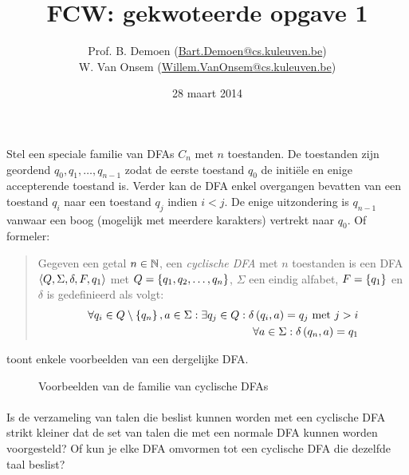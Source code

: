 \documentclass{article}
\title{FCW: gekwoteerde opgave 1}
\author{Prof. B. Demoen (\url{Bart.Demoen@cs.kuleuven.be})\\ W. Van Onsem (\url{Willem.VanOnsem@cs.kuleuven.be})}
\date{28 maart 2014}
\begin{document}
\maketitle
\richtlijnen{}
\aboutanswers{}
\begin{question} Stel een speciale familie van DFAs $C_n$ met $n$ toestanden. De toestanden zijn geordend $q_0,q_1,\ldots,q_{n-1}$ zodat de eerste toestand $q_0$ de initi\"ele en enige accepterende toestand is. Verder kan de DFA enkel overgangen bevatten van een toestand $q_i$ naar een toestand $q_j$ indien $i<j$. De enige uitzondering is $q_{n-1}$ vanwaar een boog (mogelijk met meerdere karakters) vertrekt naar $q_0$. Of formeler:
\begin{quote}\begin{definition}
Gegeven een getal $n\in\mathbb{N}$, een \emph{cyclische DFA} met $n$ toestanden is een DFA $\left\langle Q,\Sigma,\delta,F,q_1 \right\rangle$ met $Q=\left\{ q_1,q_2,\ldots,q_n \right\}$, $\Sigma$ een eindig alfabet, $F=\left\{ q_1 \right\}$ en $\delta$ is gedefinieerd als volgt:
\begin{eqnarray}
\forall q_i\in Q\setminus\left\{ q_n \right\},a\in\Sigma:\exists q_j\in Q:\delta\left( q_i,a \right)=q_j\mbox{ met } j>i\\
\forall a\in\Sigma:\delta\left( q_n,a \right)=q_1
\end{eqnarray}
\end{definition}\end{quote}
\begin{example}
 toont enkele voorbeelden van een dergelijke DFA.
\begin{figure}[hbt]
\centering
{}
\caption{Voorbeelden van de familie van cyclische DFAs}
\end{figure}
\end{example}
\paragraph{}
Is de verzameling van talen die beslist kunnen worden met een cyclische DFA strikt kleiner dat de set van talen die met een normale DFA kunnen worden voorgesteld? Of kun je elke DFA omvormen tot een cyclische DFA die dezelfde taal beslist?


\end{question}
\end{document}
